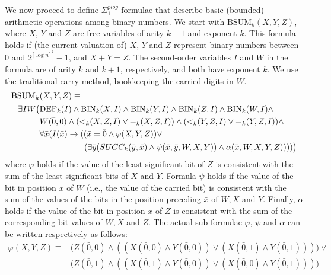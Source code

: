 \documentclass{article}
\begin{document}
We now proceed to define $\Sigma^{\mathit{plog}}_1$-formulae that describe basic (bounded) arithmetic operations among binary numbers. We start with $\mathrm{BSUM}_k(X,Y,Z)$, where $X$, $Y$ and $Z$ are free-variables of arity $k+1$ and exponent $k$. This formula holds if (the current valuation of) $X$, $Y$ and $Z$ represent binary numbers between $0$ and $2^{\lceil\log n \rceil^k} - 1$, and $X + Y = Z$. The second-order variables $I$ and $W$ in the formula are of arity $k$ and $k+1$, respectively, and both have exponent $k$. We use the traditional carry method, bookkeeping the carried digits in $W$. 
\begin{align}
\mathrm{BSUM}_k&(X,Y,Z) \equiv \notag \\
\exists I  W \big(&\mathrm{DEF}_k(I) \wedge \mathrm{BIN}_k(X,I) \wedge \mathrm{BIN}_k(Y,I) \wedge \mathrm{BIN}_k(Z,I) \wedge \mathrm{BIN}_k(W,I) \wedge \notag \\
&W(\bar{0},0) \wedge ({<_k}(X, Z, I) \vee {=_k}(X, Z, I)) \wedge ({<_k}(Y, Z, I) \vee {=_k}(Y, Z, I)) \wedge \notag \\
&\forall \bar{x} (I(\bar{x}) \to ( (\bar{x} = \bar{0} \wedge \varphi(X, Y, Z)) \vee  \notag\\
&\hspace*{1.9cm} (\exists \bar{y} (SUCC_k(\bar{y},\bar{x}) \wedge \psi(\bar{x}, \bar{y}, W, X, Y)) \wedge  \alpha(\bar{x}, W, X, Y, Z))))\big) \label{arith8}
\end{align}
where $\varphi$ holds if the value of the least significant bit of $Z$ is consistent with the sum of the least significant bits of $X$ and $Y$. Formula $\psi$ holds if the value of the bit in position $\bar{x}$ of $W$ (i.e., the value of the carried bit) is consistent with the sum of the values of the bits in the position preceding $\bar{x}$ of $W,X$ and $Y$. Finally, $\alpha$ holds if the value of the bit in position $\bar{x}$ of $Z$ is consistent with the sum of the corresponding bit values of $W,X$ and $Z$. The actual sub-formulae $\varphi$, $\psi$ and $\alpha$ can be written respectively as follows:
\begin{align*}
\varphi(X, Y, Z) \equiv &
\big( Z(\bar{0},0) \wedge ( (X(\bar{0},0) \wedge Y(\bar{0},0)) \vee (X(\bar{0},1) \wedge Y(\bar{0},1)) ) \big) \vee\\
&\big( Z(\bar{0},1) \wedge ( (X(\bar{0},1) \wedge Y(\bar{0},0)) \vee (X(\bar{0},0) \wedge Y(\bar{0},1)) ) \big)
\end{align*} 
\end{document}
